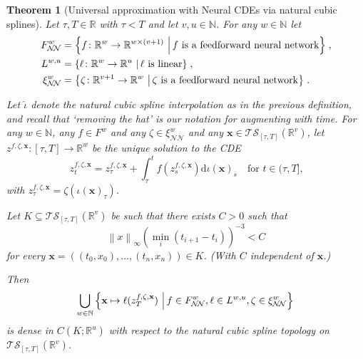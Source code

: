 \documentclass{article}
\theoremstyle{plain}
\newtheorem{thm}{Theorem}[section]
\theoremstyle{definition}
\newcommand{\ts}[2]{\mathcal{T\!S}_{#1}\left(#2\right)}
\newcommand{\norm}[1]{\left\|#1\right\|}
\newcommand{\reals}{\mathbb{R}}
\newcommand{\naturals}{\mathbb{N}}
\newcommand{\set}[2]{\left\{{#1}\,\left\vert\,{#2}\vphantom{{#1}}\right\}\right.}
\begin{document}
	\begin{thm}[Universal approximation with Neural CDEs via natural cubic splines]\label{thm:datawise-universal-approximation}
	Let $\tau, T \in \reals$ with $\tau < T$ and let $v, u \in \naturals$. For any $w \in \naturals$ let
	\begin{align*}
	F^w_{\mathcal{N\!N}} &= \set{f \colon \reals^w \to \reals^{w \times (v + 1)}}{f \text{ is a feedforward neural network}},\\
	L^{w, u} &= \set{\ell \colon \reals^w \to \reals^u}{\ell \text{ is linear}},\\
	\xi^w_{\mathcal{N\!N}}&= \set{\zeta \colon \reals^{v + 1} \to \reals^w}{\zeta \text{ is a feedforward neural network}}.
	\end{align*}
	
	Let $\widehat{\iota}$ denote the natural cubic spline interpolation as in the previous definition, and recall that `removing the hat' is our notation for augmenting with time. For any $w \in \naturals$, any $f \in F^w$ and any $\zeta \in \xi^w_{\mathcal{N\!N}}$ and any $\mathbf{x} \in \ts{[\tau, T]}{\reals^v}$, let $z^{f, \zeta, \mathbf{x}} \colon [\tau, T] \to \reals^w$ be the unique solution to the CDE
	\begin{equation*}
	z^{f, \zeta, \mathbf{x}}_t = z^{f, \zeta, \mathbf{x}}_\tau + \int_\tau^t f(z^{f, \zeta, \mathbf{x}}_s) \mathrm{d}\iota(\mathbf{x})_s\quad\text{for $t \in (\tau, T]$,}
	\end{equation*}
	with $z^{f, \zeta, \mathbf{x}}_\tau = \zeta(\iota(\mathbf{x})_\tau)$.
	
	Let $K \subseteq \ts{[\tau, T]}{\reals^v}$ be such that there exists $C > 0$ such that
	\begin{equation}
	\norm{x}_\infty (\min_i (t_{i + 1} - t_i))^{-3} < C \label{eq:compact-require}
	\end{equation}
	for every $\mathbf{x} = ((t_0, x_0), \ldots, (t_n, x_n)) \in K$. (With $C$ independent of $\mathbf{x}$.)
	
	Then
	\begin{equation*}
	\bigcup_{w \in \naturals} \set{\mathbf{x} \mapsto \ell(z^{f, \zeta, \mathbf{x}}_T)}{f \in F^w_{\mathcal{N\!N}}, \ell \in L^{w, u}, \zeta \in \xi^w_{\mathcal{N\!N}}}
	\end{equation*}
	is dense in $C(K; \reals^u)$ with respect to the natural cubic spline topology on $\ts{[\tau, T]}{\reals^v}$.
	\end{thm}
\end{document}
